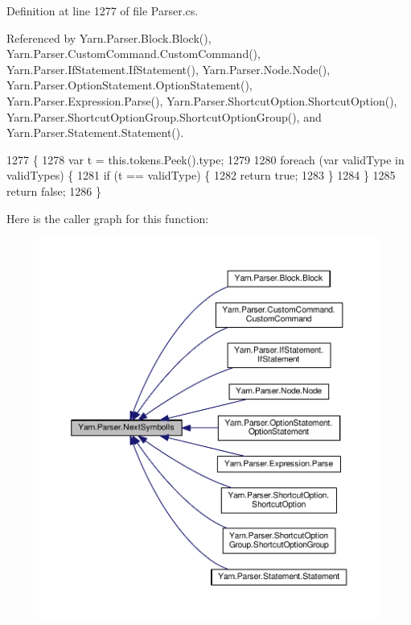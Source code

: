 Definition at line 1277 of file Parser.\-cs.



Referenced by Yarn.\-Parser.\-Block.\-Block(), Yarn.\-Parser.\-Custom\-Command.\-Custom\-Command(), Yarn.\-Parser.\-If\-Statement.\-If\-Statement(), Yarn.\-Parser.\-Node.\-Node(), Yarn.\-Parser.\-Option\-Statement.\-Option\-Statement(), Yarn.\-Parser.\-Expression.\-Parse(), Yarn.\-Parser.\-Shortcut\-Option.\-Shortcut\-Option(), Yarn.\-Parser.\-Shortcut\-Option\-Group.\-Shortcut\-Option\-Group(), and Yarn.\-Parser.\-Statement.\-Statement().


\begin{DoxyCode}
1277                                                          \{
1278             var t = this.tokens.Peek().type;
1279 
1280             \textcolor{keywordflow}{foreach} (var validType \textcolor{keywordflow}{in} validTypes) \{
1281                 \textcolor{keywordflow}{if} (t == validType) \{
1282                     \textcolor{keywordflow}{return} \textcolor{keyword}{true};
1283                 \}
1284             \}
1285             \textcolor{keywordflow}{return} \textcolor{keyword}{false};
1286         \}
\end{DoxyCode}


Here is the caller graph for this function\-:
\nopagebreak
\begin{figure}[H]
\begin{center}
\leavevmode
\includegraphics[width=350pt]{a00149_a666a945da1a7845b02b92592fccac291_icgraph}
\end{center}
\end{figure}


